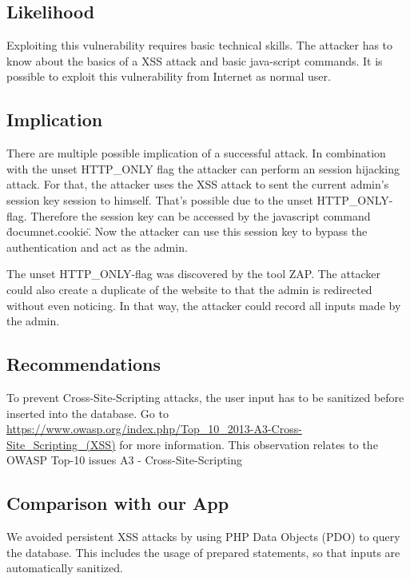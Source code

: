 \subsection{Likelihood}
Exploiting this vulnerability requires basic technical skills. The attacker has to know about the basics of a XSS attack and basic java-script commands. It is possible to exploit this vulnerability from Internet as normal user.

\subsection{Implication}
There are multiple possible implication of a successful attack.  In combination with the unset HTTP\_ONLY flag  the attacker can perform an session hijacking  attack. For that, the attacker uses the XSS attack to sent the current admin's session key session to himself. That's possible due to the unset HTTP\_ONLY-flag.  Therefore the session key can be accessed by the javascript command \"documnet.cookie\". Now the attacker can use this session key to bypass the authentication and act as the admin. 

The unset HTTP\_ONLY-flag  was discovered by the tool ZAP.
The attacker could also create a duplicate of the website to that the admin is redirected without even noticing. In that way, the attacker could record all inputs made by the admin.



\subsection{Recommendations}
To prevent Cross-Site-Scripting attacks, the user input has to be sanitized before inserted into the database. Go to \url{https://www.owasp.org/index.php/Top_10_2013-A3-Cross-Site_Scripting_(XSS)} for more information. \newline
This observation relates to the OWASP Top-10 issues A3 - Cross-Site-Scripting

\subsection{Comparison with our App}
We avoided persistent XSS attacks by using PHP Data Objects (PDO) to query the database. 
This includes the usage of prepared statements, so that 
inputs are automatically sanitized.